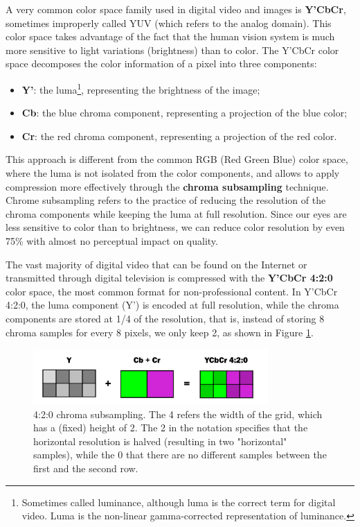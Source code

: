 A very common color space family used in digital video and images is \textbf{Y'CbCr}, sometimes improperly called YUV (which refers to the analog domain). This color space takes advantage of the fact that the human vision system is much more sensitive to light variations (brightness) than to color. The Y'CbCr color space decomposes the color information of a pixel into three components:

\begin{itemize}
    \item \textbf{Y'}: the luma\footnote{Sometimes called luminance, although luma is the correct term for digital video. Luma is the non-linear gamma-corrected representation of luminance.}, representing the brightness of the image;
    \item \textbf{Cb}: the blue chroma component, representing a projection of the blue color;
    \item \textbf{Cr}: the red chroma component, representing a projection of the red color.
\end{itemize}

This approach is different from the common RGB (Red Green Blue) color space, where the luma is not isolated from the color components, and allows to apply compression more effectively through the \textbf{chroma subsampling} technique. Chrome subsampling refers to the practice of reducing the resolution of the chroma components while keeping the luma at full resolution. Since our eyes are less sensitive to color than to brightness, we can reduce color resolution by even 75\% with almost no perceptual impact on quality.

The vast majority of digital video that can be found on the Internet or transmitted through digital television is compressed with the \textbf{Y'CbCr 4:2:0} color space, the most common format for non-professional content. In Y'CbCr 4:2:0, the luma component (Y') is encoded at full resolution, while the chroma components are stored at 1/4 of the resolution, that is, instead of storing 8 chroma samples for every 8 pixels, we only keep 2, as shown in Figure \ref{fig:yuv420}.

\begin{figure}[h]
	\centering
	\includegraphics[width=0.8\textwidth]{res/yuv420.png}
	\caption{4:2:0 chroma subsampling. The 4 refers the width of the grid, which has a (fixed) height of 2. The 2 in the notation specifies that the horizontal resolution is halved (resulting in two "horizontal" samples), while the 0 that there are no different samples between the first and the second row.}
	\label{fig:yuv420}
\end{figure}

